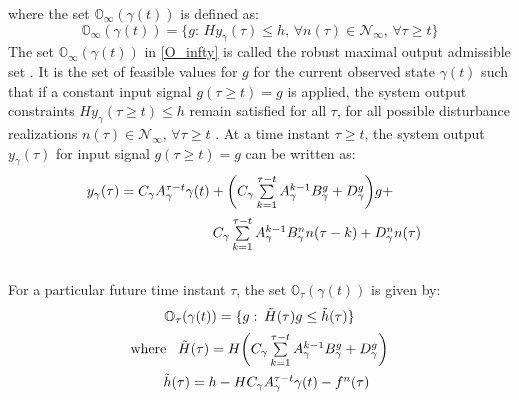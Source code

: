 \documentclass[letterpaper, 10 pt, conference]{ieeeconf}  %
\begin{document}
	\normalsize
	where the set $\mathbb{O}_{\infty}(\gamma(t))$ is defined as:
	\begin{equation}
	\mathbb{O}_{\infty}(\gamma(t)) = \{g: \hspace{2pt} Hy_{\gamma}(\tau) \leq h ,\hspace{2pt} \forall n(\tau) \in \mathcal{N}_{\infty} ,\hspace{2pt} \forall \tau \geq t \} 
	\label{O_infty}
	\end{equation}
	The set $\mathbb{O}_{\infty}(\gamma(t))$ in \eqref{O_infty} is called the robust maximal output admissible set \cite{GARONE2017306}.
	It is the set of feasible values for $g$ for the current observed state $\gamma(t)$ such that if a constant input signal $g(\tau \geq t)=g$ is applied, the system output constraints $Hy_{\gamma}(\tau \geq t) \leq h$ remain satisfied for all $\tau$, for all possible disturbance realizations $n(\tau) \in \mathcal{N}_{\infty}$, $\forall \tau \geq t$ .
	At a time instant $\tau \geq t$, the system output $y_{\gamma}(\tau)$ for input signal $g(\tau \geq t)=g$ can be written as:
	\begin{equation*}
	\hspace{-30pt}
	\begin{aligned}
	\begin{matrix}
	y_{\gamma}(\tau) = C_{\gamma}A_{\gamma}^{\tau - t}\gamma(t) + \bigg( C_{\gamma}\sum\limits_{k=1}^{\tau - t}A_{\gamma}^{k-1}B^g_{\gamma} + D_{\gamma}^g \bigg)g + \vspace{5pt}\\  \hspace{110pt} C_{\gamma}\sum\limits_{k=1}^{\tau - t}A_{\gamma}^{k-1}B^n_{\gamma}n(\tau-k) + D_{\gamma}^n n(\tau)
	\end{matrix}
	\end{aligned}
	\end{equation*} \\
	For a particular future time instant $\tau$, the set $\mathbb{O}_{\tau}(\gamma(t))$ is given by:
	\begin{equation*}
	\begin{matrix}
	\mathbb{O}_{\tau}(\gamma(t)) = \{g: \hspace{2pt} \tilde{H}(\tau)g \leq \tilde{h}(\tau)\} \vspace{5pt}\\
	\text{where } \hspace{5pt} \tilde{H}(\tau) = H\bigg( C_{\gamma}\sum\limits_{k=1}^{\tau - t}A_{\gamma}^{k-1}B^g_{\gamma} + D_{\gamma}^g \bigg) \vspace{5pt} \\ \hspace{10pt}
	\tilde{h}(\tau) = h - HC_{\gamma}A_{\gamma}^{\tau - t}\gamma(t) - f^n(\tau) \vspace{5pt}
	\end{matrix} 
	\end{equation*}
\end{document}
